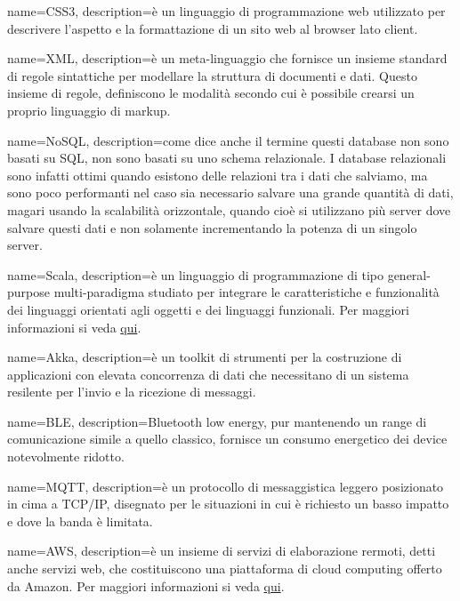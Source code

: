  {
	name=CSS3,
	description={è un linguaggio di programmazione web utilizzato per descrivere l'aspetto e la formattazione di un sito web al browser lato client. }
}

 {
	name=XML,
	description={è un meta-linguaggio che fornisce un insieme standard di regole sintattiche per modellare la struttura di documenti e dati. Questo insieme di regole, definiscono le modalità secondo cui è possibile crearsi un proprio linguaggio di markup.}
}

 {
	name=NoSQL,
	description={come dice anche il termine questi database non sono basati su SQL, non sono basati su uno schema relazionale. I database relazionali sono infatti ottimi quando esistono delle relazioni tra i dati che salviamo, ma sono poco performanti nel caso sia necessario salvare una grande quantità di dati, magari usando la scalabilità orizzontale, quando cioè si utilizzano più server dove salvare questi dati e non solamente incrementando la potenza di un singolo server.
}

 {
	name=Scala,
	description={è un linguaggio di programmazione di tipo general-purpose multi-paradigma studiato per integrare le caratteristiche e funzionalità dei linguaggi orientati agli oggetti e dei linguaggi funzionali. Per maggiori informazioni si veda \href{https://it.wikipedia.org/wiki/Scala_(linguaggio_di_programmazione)}{qui}.}
}

 {
	name=Akka,
	description={è un toolkit di strumenti per la costruzione di applicazioni con elevata concorrenza di dati che necessitano di un sistema resilente per l'invio e la ricezione di messaggi.}
}

 {
	name=BLE,
	description={Bluetooth low energy,  pur mantenendo un range di comunicazione simile a quello classico, fornisce un  consumo energetico dei device notevolmente ridotto.}
}

 {
	name=MQTT,
	description={è un protocollo di messaggistica leggero posizionato in cima a TCP/IP, disegnato per le situazioni in cui è richiesto un basso impatto e dove la banda è limitata. }
}

 {
	name=AWS,
	description={è un insieme di servizi di elaborazione rermoti, detti anche servizi web, che costituiscono una piattaforma di cloud computing offerto da Amazon. Per maggiori informazioni si veda \href{https://aws.amazon.com/it/}{qui}.}
}

}
